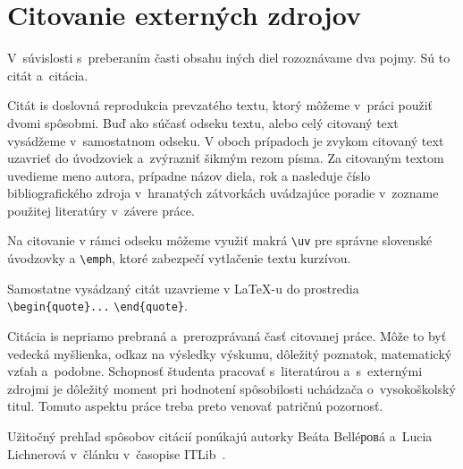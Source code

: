 \documentclass[../../thesis.tex]{subfiles}
\begin{document}
\section{Citovanie externých zdrojov}\label{sec:citation}
V~súvislosti s~preberaním časti obsahu iných diel
rozoznávame dva pojmy. Sú to citát a~citácia.

Citát is doslovná reprodukcia prevzatého textu,
ktorý môžeme v~práci použiť dvomi spôsobmi.
Buď ako súčasť odseku textu,
alebo celý citovaný text vysádžeme v~samostatnom odseku.
V oboch prípadoch je zvykom citovaný text uzavrieť do úvodzoviek
a~zvýrazniť šikmým rezom písma.
Za citovaným textom uvedieme meno autora,
prípadne názov diela, rok a nasleduje číslo bibliografického
zdroja v~hranatých zátvorkách uvádzajúce poradie
v~zozname použitej literatúry v~závere práce.

Na citovanie v rámci odseku môžeme využiť makrá \verb|\uv| pre
správne slovenské úvodzovky a \verb|\emph|,
ktoré zabezpečí vytlačenie textu kurzívou.

Samostatne vysádzaný citát uzavrieme v \LaTeX-u do prostredia
\verb|\begin{quote}...| \verb|\end{quote}|.

Citácia is nepriamo prebraná a~prerozprávaná
časť citovanej práce.
Môže to byť vedecká myšlienka, odkaz na výsledky výskumu,
dôležitý poznatok, matematický vzťah a~podobne.
Schopnosť študenta pracovať s~literatúrou a~s~externými zdrojmi
je dôležitý moment pri hodnotení spôsobilosti uchádzača
o~vysokoškolský titul.
Tomuto aspektu práce treba preto venovať patričnú pozornosť.

Užitočný prehľad spôsobov citácií ponúkajú autorky
Beáta Belléровá a~Lucia Lichnerová v~článku v~časopise ITLib~\cite{Lichnerova2023Nove}.









\end{document}
